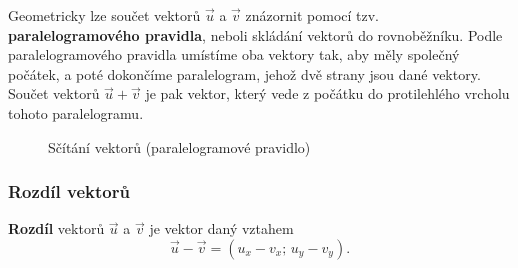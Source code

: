 Geometricky lze součet vektorů $\vec{u}$ a $\vec{v}$ znázornit pomocí tzv. \textbf{paralelogramového pravidla}, neboli skládání vektorů do rovnoběžníku.
Podle paralelogramového pravidla umístíme oba vektory tak, aby měly společný počátek, a poté dokončíme paralelogram, jehož dvě strany jsou dané vektory.
Součet vektorů $\vec{u} + \vec{v}$ je pak vektor, který vede z počátku do protilehlého vrcholu tohoto paralelogramu.

\begin{figure}[H]
    \centering
    \caption{Sčítání vektorů (paralelogramové pravidlo)}
\end{figure}

\subsubsection{Rozdíl vektorů}\label{subsubsec:Vector_subtraction}
\begin{definition}\label{def:vector_subtraction}
    \textbf{Rozdíl} vektorů $\vec{u}$ a $\vec{v}$ je vektor daný vztahem
    \begin{equation}\label{eq:vector_subtraction}
        \vec{u} - \vec{v} = (u_x - v_x;\, u_y - v_y).
    \end{equation}
\end{definition}

